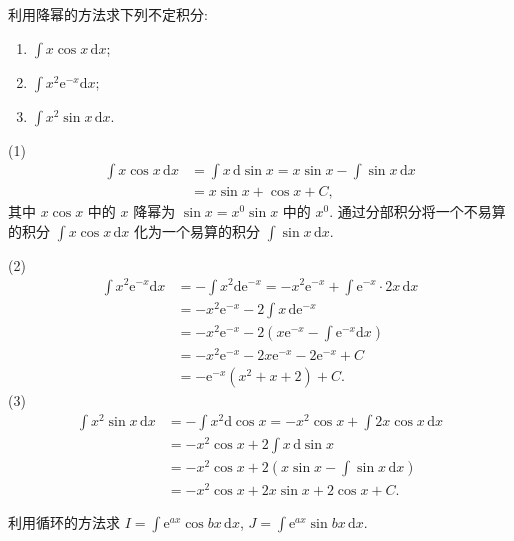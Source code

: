 \begin{example}\label{ex:5.2.11}
利用降幂的方法求下列不定积分:
\begin{enumerate}[label=(\arabic*)]
  \item $\int x\cos x\,\mathrm{d}x$;
  \item $\int x^{2}\mathrm{e}^{-x}\mathrm{d}x$;
  \item $\int x^{2}\sin x\,\mathrm{d}x$.
\end{enumerate}
\end{example}

\begin{solution}
(1)
\begin{align*}
\int x\cos x\,\mathrm{d}x&=\int x\,\mathrm{d}\sin x=x\sin x-\int\sin x\,\mathrm{d}x\\
&=x\sin x+\cos x+C,
\end{align*}
其中 $x\cos x$ 中的 $x$ 降幂为 $\sin x=x^{0}\sin x$ 中的 $x^{0}$. 通过分部积分将一个不易算的积分 $\int x\cos x\,\mathrm{d}x$ 化为一个易算的积分 $\int\sin x\,\mathrm{d}x$.

(2)
\begin{align*}
\int x^{2}\mathrm{e}^{-x}\mathrm{d}x&=-\int x^{2}\mathrm{d}\mathrm{e}^{-x}=-x^{2}\mathrm{e}^{-x}+\int\mathrm{e}^{-x}\cdot 2x\,\mathrm{d}x\\
&=-x^{2}\mathrm{e}^{-x}-2\int x\,\mathrm{d}\mathrm{e}^{-x}\\
&=-x^{2}\mathrm{e}^{-x}-2\left(x\mathrm{e}^{-x}-\int\mathrm{e}^{-x}\mathrm{d}x\right)\\
&=-x^{2}\mathrm{e}^{-x}-2x\mathrm{e}^{-x}-2\mathrm{e}^{-x}+C\\
&=-\mathrm{e}^{-x}(x^{2}+x+2)+C.
\end{align*}
(3)
\begin{align*}
\int x^{2}\sin x\,\mathrm{d}x&=-\int x^{2}\mathrm{d}\cos x=-x^{2}\cos x+\int 2x\cos x\,\mathrm{d}x\\
&=-x^{2}\cos x+2\int x\,\mathrm{d}\sin x\\
&=-x^{2}\cos x+2\left(x\sin x-\int\sin x\,\mathrm{d}x\right)\\
&=-x^{2}\cos x+2x\sin x+2\cos x+C.
\end{align*}
\end{solution}

\begin{example}\label{ex:5.2.12}
利用循环的方法求 $I=\int\mathrm{e}^{ax}\cos bx\,\mathrm{d}x$, $J=\int\mathrm{e}^{ax}\sin bx\,\mathrm{d}x$.
\end{example}

